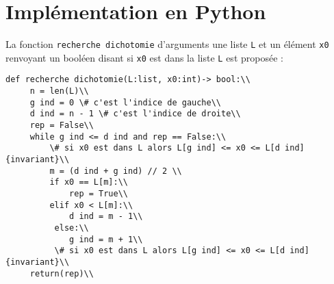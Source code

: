  

\section{Implémentation en Python}


La fonction \texttt{recherche dichotomie} d'arguments une liste \texttt{L} et un élément \texttt{x0} renvoyant un booléen disant si \texttt{x0} est dans la liste \texttt{L} est proposée :



\begin{lstlisting}
def recherche dichotomie(L:list, x0:int)-> bool:\\
     n = len(L)\\
     g ind = 0 \# c'est l'indice de gauche\\
     d ind = n - 1 \# c'est l'indice de droite\\
     rep = False\\
     while g ind <= d ind and rep == False:\\
         \# si x0 est dans L alors L[g ind] <= x0 <= L[d ind]     {invariant}\\ 
         m = (d ind + g ind) // 2 \\
         if x0 == L[m]:\\
             rep = True\\
         elif x0 < L[m]:\\
             d ind = m - 1\\
          else:\\
             g ind = m + 1\\
          \# si x0 est dans L alors L[g ind] <= x0 <= L[d ind]     {invariant}\\
     return(rep)\\

\end{lstlisting} 



